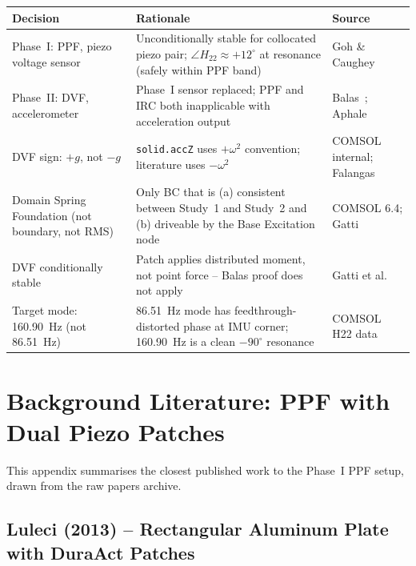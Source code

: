 \documentclass[12pt,a4paper]{article}
\begin{document}
\begin{center}
\begin{tabular}{p{4cm} p{5cm} p{5cm}}
\toprule
Decision & Rationale & Source \\
\midrule
Phase~I: PPF, piezo voltage sensor
  & Unconditionally stable for collocated piezo pair;
    $\angle H_{22} \approx +12^\circ$ at resonance (safely within PPF band)
  & Goh \& Caughey~\cite{goh1985} \\[6pt]
Phase~II: DVF, accelerometer
  & Phase~I sensor replaced; PPF and IRC both inapplicable with acceleration output
  & Balas~\cite{balas1979}; Aphale~\cite{aphale2007} \\[6pt]
DVF sign: $+g$, not $-g$
  & \texttt{solid.accZ} uses $+\omega^2$ convention; literature uses $-\omega^2$
  & COMSOL internal; Falangas~\cite{falangas1994} \\[6pt]
Domain Spring Foundation (not boundary, not RMS)
  & Only BC that is (a) consistent between Study~1 and Study~2 and
    (b) driveable by the Base Excitation node
  & COMSOL 6.4; Gatti~\cite{gatti2007} \\[6pt]
DVF conditionally stable
  & Patch applies distributed moment, not point force -- Balas proof does not apply
  & Gatti et al.~\cite{gatti2007} \\[6pt]
Target mode: 160.90~Hz (not 86.51~Hz)
  & 86.51~Hz mode has feedthrough-distorted phase at IMU corner;
    160.90~Hz is a clean $-90^\circ$ resonance
  & COMSOL H22 data \\
\bottomrule
\end{tabular}
\end{center}

\newpage
\appendix

\section{Background Literature: PPF with Dual Piezo Patches}
\label{app:ppf_lit}

This appendix summarises the closest published work to the Phase~I PPF setup,
drawn from the raw papers archive.

\subsection*{Luleci (2013) -- Rectangular Aluminum Plate with DuraAct Patches}
\end{document}

